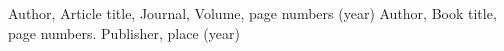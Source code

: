 

%
%



\begin{thebibliography}{asdf}
%
%
Author, Article title, Journal, Volume, page numbers (year)
Author, Book title, page numbers. Publisher, place (year)
\end{thebibliography}



